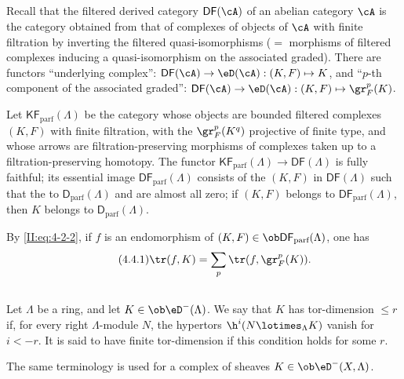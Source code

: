 \subsection{}\label{II:4-4}

Recall that the filtered derived category $\mathsf{DF}(\cA)$ of an abelian
category $\cA$ is the category obtained from that of complexes of objects of
$\cA$ with finite filtration by inverting the filtered quasi-isomorphisms
($=$ morphisms of filtered complexes inducing a quasi-isomorphism on the
associated graded). There are functors ``underlying complex'':
$\mathsf{DF}(\cA)\to\eD(\cA): (K,F)\mapsto K$, and ``$p$-th component of the
associated graded'':
$\mathsf{DF}(\cA)\to\eD(\cA): (K,F)\mapsto \gr_F^p(K)$.

Let $\mathsf{KF}_\text{parf}(\Lambda)$ be the category whose objects are
bounded filtered complexes $(K,F)$ with finite filtration, with the
$\gr_F^p(K^q)$ projective of finite type, and whose arrows are
filtration-preserving morphisms of complexes taken up to a
filtration-preserving homotopy. The functor
$\mathsf{KF}_\text{parf}(\Lambda)\to\mathsf{DF}(\Lambda)$ is fully faithful;
its essential image $\mathsf{DF}_\text{parf}(\Lambda)$ consists of the $(K,F)$ in
$\mathsf{DF}(\Lambda)$ such that the  to
$\mathsf{D}_\text{parf}(\Lambda)$ and are almost all zero; if $(K,F)$ belongs to
$\mathsf{DF}_\text{parf}(\Lambda)$, then $K$ belongs to
$\mathsf{D}_\text{parf}(\Lambda)$.

By \eqref{II:eq:4-2-2}, if $f$ is an endomorphism of
$(K,F)\in\ob\mathsf{DF}_\text{parf}(\Lambda)$, one has
\begin{equation*}\tag{4.4.1}\label{II:eq:4-4-1}
 \tr(f,K) = \sum_p \tr(f,\gr_F^p(K)) \text{.}
\end{equation*}






\subsection{}\label{II:4-5}

Let $\Lambda$ be a ring, and let $K\in\ob\eD^-(\Lambda)$. We say that $K$
has tor-dimension $\leqslant r$ if, for every right $\Lambda$-module $N$, the
hypertors $\h^i(N\lotimes_\Lambda K)$ vanish for $i<-r$. It is said to have
finite tor-dimension if this condition holds for some $r$.

The same terminology is used for a complex of sheaves
$K\in\ob\eD^-(X,\Lambda)$.






